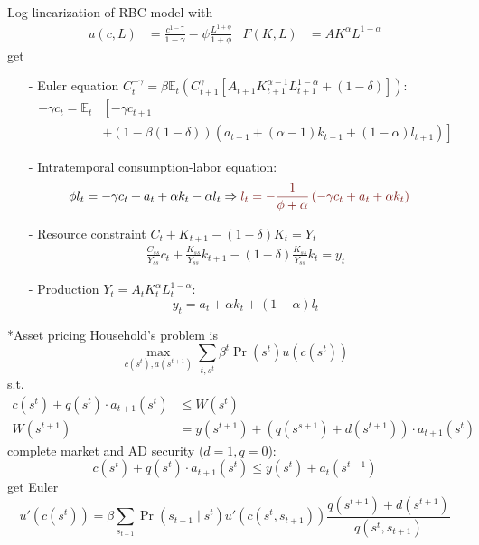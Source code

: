 \documentclass[10pt,a4paper]{article}
\makeatletter
\renewcommand{\subsection}{\@startsection{subsection}{1}{0mm}{.2ex}{.2ex}{\small\bfseries}}
\makeatother
\begin{document}
\begin{multicols*}{3}
Log linearization of RBC model with 
\begin{align*}
    u(c,L)&=\frac{c^{1-\gamma}}{1-\gamma}-\psi\frac{L^{1+\phi}}{1+\phi} & F(K,L) &=AK^{\alpha}L^{1-\alpha}
\end{align*}
get

\begin{itemize}
    \item[-] Euler equation $C_t^{-\gamma}=\beta \mathbb{E}_t\left( C_{t+1}^{\gamma}\left[ A_{t+1}K_{t+1}^{\alpha-1}L_{t+1}^{1-\alpha}+(1-\delta)\right] \right)$:
    \begin{align*}
        -\gamma c_t = \mathbb{E}_t&\left[ -\gamma c_{t+1}\right. \\
        &+ \left.(1-\beta(1-\delta)) \left(a_{t+1}+(\alpha-1)k_{t+1}+(1-\alpha)l_{t+1}\right) \right]
    \end{align*}
    \item[-] Intratemporal consumption-labor equation:
    \begin{align*}
        \phi l_t = -\gamma c_t + a_t +\alpha k_t -\alpha l_t &\Rightarrow {\color{myred}l_t  = -\frac{1}{\phi+\alpha}\left(-\gamma c_t+a_t+\alpha k_t\right)}
    \end{align*}
    \item[-] Resource constraint $ C_t+K_{t+1}-(1-\delta)K_t = Y_t$
    \begin{align*}
        \frac{C_{ss}}{Y_{ss}}c_t +\frac{K_{ss}}{Y_{ss}}k_{t+1} - (1-\delta)\frac{K_{ss}}{Y_{ss}}k_t = y_t
    \end{align*}
    \item[-] Production $Y_t=A_tK_t^{\alpha}L_t^{1-\alpha}$:
    $$
    y_t = a_t +\alpha k_t +(1-\alpha)l_t
    $$
\end{itemize}

\subsection*{Asset pricing}
Household's problem is
$$
\max_{c(s^t),a(s^{t+1})} \sum_{t,s^t}\beta^t \Pr(s^t)u(c(s^t))
$$
s.t.
\begin{align*}
    c(s^t)+q(s^t)\cdot a_{t+1}(s^t) &\leq W(s^t)\\
    W(s^{t+1}) &= y(s^{t+1})+\left( q(s^{s+1}) + d(s^{t+1}) \right)\cdot a_{t+1}(s^t)
\end{align*}
complete market and AD security ($d=1,q=0$):
$$
c(s^t)+q(s^t)\cdot a_{t+1}(s^t) \leq y(s^t)+a_t(s^{t-1})
$$
get Euler
$$
u'(c(s^t)) = \beta \sum_{s_{t+1}}\Pr(s_{t+1}\mid s^t)u'(c(s^t,s_{t+1}))\frac{q(s^{t+1})+d(s^{t+1})}{q(s^t,s_{t+1})}
$$


\end{multicols*}
\end{document}
